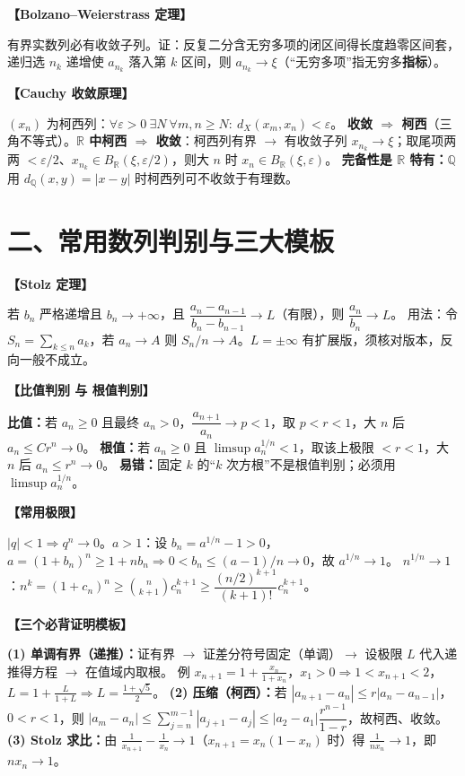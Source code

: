 \documentclass[12pt,a4paper,UTF8]{ctexart}
\newcommand{\R}{\mathbb R}
\newcommand{\eps}{\varepsilon}
\newenvironment{kp}[1]{\par\smallskip\noindent\textbf{【#1】}\par\nobreak\smallskip}{\par\smallskip}
\begin{document}
\begin{kp}{Bolzano–Weierstrass 定理}
有界实数列必有收敛子列。证：反复二分含无穷多项的闭区间得长度趋零区间套，递归选 $n_k$ 递增使 $a_{n_k}$ 落入第 $k$ 区间，则 $a_{n_k}\to\xi$（“无穷多项”指无穷多\textbf{指标}）。
\end{kp}

\begin{kp}{Cauchy 收敛原理}
$(x_n)$ 为柯西列：$\forall\eps>0\ \exists N\ \forall m,n\ge N:\ d_X(x_m,x_n)<\eps$。
\textbf{收敛 $\Rightarrow$ 柯西}（三角不等式）。\textbf{$\R$ 中柯西 $\Rightarrow$ 收敛}：柯西列有界 $\to$ 有收敛子列 $x_{n_k}\to\xi$；取尾项两两 $<\eps/2$、$x_{n_k}\in B_\R(\xi,\eps/2)$，则大 $n$ 时 $x_n\in B_\R(\xi,\eps)$。
\textbf{完备性是 $\R$ 特有：}$\mathbb Q$ 用 $d_\mathbb Q(x,y)=|x-y|$ 时柯西列可不收敛于有理数。
\end{kp}

\section*{二、常用数列判别与三大模板}

\begin{kp}{Stolz 定理}
若 $b_n$ 严格递增且 $b_n\to+\infty$，且 $\dfrac{a_n-a_{n-1}}{b_n-b_{n-1}}\to L$（有限），则 $\dfrac{a_n}{b_n}\to L$。
用法：令 $S_n=\sum_{k\le n}a_k$，若 $a_n\to A$ 则 $S_n/n\to A$。$L=\pm\infty$ 有扩展版，须核对版本，反向一般不成立。
\end{kp}

\begin{kp}{比值判别 与 根值判别}
\textbf{比值：}若 $a_n\ge0$ 且最终 $a_n>0$，$\dfrac{a_{n+1}}{a_n}\to p<1$，取 $p<r<1$，大 $n$ 后 $a_n\le Cr^n\to0$。
\textbf{根值：}若 $a_n\ge0$ 且 $\limsup a_n^{1/n}<1$，取该上极限 $<r<1$，大 $n$ 后 $a_n\le r^n\to0$。
\textbf{易错：}固定 $k$ 的“$k$ 次方根”不是根值判别；必须用 $\limsup a_n^{1/n}$。
\end{kp}

\begin{kp}{常用极限}
$|q|<1\Rightarrow q^n\to0$。$a>1$：设 $b_n=a^{1/n}-1>0$，$a=(1+b_n)^n\ge1+nb_n\Rightarrow 0<b_n\le(a-1)/n\to0$，故 $a^{1/n}\to1$。
$n^{1/n}\to1$：$n^k=(1+c_n)^n\ge\binom n{k+1}c_n^{k+1}\ge\dfrac{(n/2)^{k+1}}{(k+1)!}c_n^{k+1}$。
\end{kp}

\begin{kp}{三个必背证明模板}
\textbf{(1)  单调有界（递推）：}证有界 $\to$ 证差分符号固定（单调）$\to$ 设极限 $L$ 代入递推得方程 $\to$ 在值域内取根。
例 $x_{n+1}=1+\frac{x_n}{1+x_n}$，$x_1>0\Rightarrow1<x_{n+1}<2$，$L=1+\frac{L}{1+L}\Rightarrow L=\frac{1+\sqrt5}{2}$。
\textbf{(2)  压缩（柯西）：}若 $|a_{n+1}-a_n|\le r|a_n-a_{n-1}|$，$0<r<1$，则
\(|a_m-a_n|\le\sum_{j=n}^{m-1}|a_{j+1}-a_j|\le|a_2-a_1|\dfrac{r^{n-1}}{1-r}\)，故柯西、收敛。
\textbf{(3)  Stolz 求比：}由 $\frac1{x_{n+1}}-\frac1{x_n}\to1$（$x_{n+1}=x_n(1-x_n)$ 时）得 $\frac1{nx_n}\to1$，即 $nx_n\to1$。
\end{kp}
\end{document}
